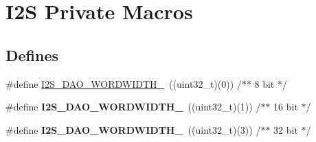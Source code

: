 \hypertarget{group___i2_s___private___macros}{\section{\-I2\-S \-Private \-Macros}
\label{group___i2_s___private___macros}
}
\subsection*{\-Defines}
\begin{DoxyCompactItemize}
\item 
\#define \hyperlink{group___i2_s___private___macros_ga9e390ef13bf52d00c311ca64d46c5ac2}{\-I2\-S\-\_\-\-D\-A\-O\-\_\-\-W\-O\-R\-D\-W\-I\-D\-T\-H\-\_}~((uint32\-\_\-t)(0))		/$\ast$$\ast$ 8 bit	$\ast$/
\item 
\hypertarget{group___i2_s___private___macros_gaf48ba0298cdb6828567de0df29abcb4d}{\#define {\bfseries \-I2\-S\-\_\-\-D\-A\-O\-\_\-\-W\-O\-R\-D\-W\-I\-D\-T\-H\-\_}~((uint32\-\_\-t)(1))		/$\ast$$\ast$ 16 bit	$\ast$/}\label{group___i2_s___private___macros_gaf48ba0298cdb6828567de0df29abcb4d}

\item 
\hypertarget{group___i2_s___private___macros_gaa6666d92294cc244c41fd510fb7de31d}{\#define {\bfseries \-I2\-S\-\_\-\-D\-A\-O\-\_\-\-W\-O\-R\-D\-W\-I\-D\-T\-H\-\_}~((uint32\-\_\-t)(3))		/$\ast$$\ast$ 32 bit	$\ast$/}\label{group___i2_s___private___macros_gaa6666d92294cc244c41fd510fb7de31d}


\end{DoxyCompactItemize}
